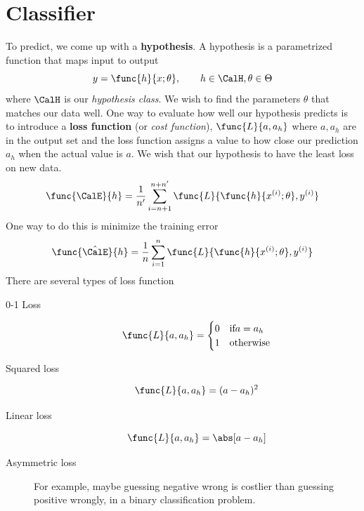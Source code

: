 \chapter{Classifier}
To predict, we come up with a \textbf{hypothesis}. A hypothesis is a parametrized function that maps input to output
\begin{equation*}
    y = \func{h}{x ; \theta} , \qquad h \in \CalH, \theta \in \Theta
\end{equation*}
where \(\CalH\) is our \textit{hypothesis class}. We wish to find the parameters \(\theta\) that matches our data well. One way to evaluate how well our hypothesis predicts is to introduce a \textbf{loss function} (or \textit{cost function}), \(\func{L}{a,a_h}\) where \(a,a_h\) are in the output set and the loss function assigns a value to how close our prediction \(a_h\) when the actual value is \(a\). We wish that our hypothesis to have the least loss on new data.
\begin{equation*}
    \func{\CalE}{h} = \dfrac{1}{n'} \sum_{i = n + 1}^{n + n'} \func{L}{\func{h}{x^{(i)} ; \theta }, y^{(i)}}
\end{equation*}
One way to do this is minimize the training error 
\begin{equation*}
    \func{\hat{\CalE}}{h} = \dfrac{1}{n} \sum_{i = 1}^n \func{L}{\func{h}{x^{(i)} ; \theta }, y^{(i)}}
\end{equation*}
There are several types of loss function
\begin{description}
    \item[0-1 Loss]
        \begin{equation*}
            \func{L}{a,a_h} = \begin{cases}
                0 & \text{if} a = a_h \\
                1 & \text{otherwise}
            \end{cases}
        \end{equation*}
    \item[Squared loss]
        \begin{equation*}
            \func{L}{a,a_h} = (a - a_h)^2
        \end{equation*}
    \item[Linear loss]
        \begin{equation*}
            \func{L}{a,a_h} = \abs[a - a_h]
        \end{equation*}
    \item[Asymmetric loss] For example, maybe guessing negative wrong is costlier than guessing positive wrongly, in a binary classification problem.
\end{description}

